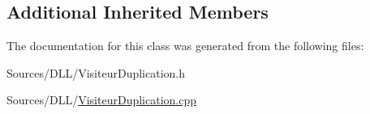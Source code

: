 \subsection*{Additional Inherited Members}


The documentation for this class was generated from the following files\+:\begin{DoxyCompactItemize}
\item 
Sources/\+D\+L\+L/Visiteur\+Duplication.\+h\item 
Sources/\+D\+L\+L/\hyperlink{_visiteur_duplication_8cpp}{Visiteur\+Duplication.\+cpp}\end{DoxyCompactItemize}
